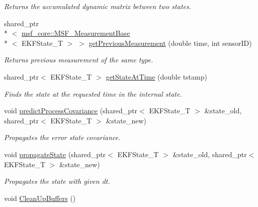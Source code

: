\begin{DoxyCompactItemize}
\begin{DoxyCompactList}\small\item\em Returns the accumulated dynamic matrix between two states. \end{DoxyCompactList}\item 
\hypertarget{classmsf__core_1_1MSF__Core_a9c6b7908fbc66dd2aebb2f08e7c0c4ff}{shared\-\_\-ptr\\*
$<$ \hyperlink{classmsf__core_1_1MSF__MeasurementBase}{msf\-\_\-core\-::\-M\-S\-F\-\_\-\-Measurement\-Base}\\*
$<$ E\-K\-F\-State\-\_\-\-T $>$ $>$ \hyperlink{classmsf__core_1_1MSF__Core_a9c6b7908fbc66dd2aebb2f08e7c0c4ff}{get\-Previous\-Measurement} (double time, int sensor\-I\-D)}\label{classmsf__core_1_1MSF__Core_a9c6b7908fbc66dd2aebb2f08e7c0c4ff}

\begin{DoxyCompactList}\small\item\em Returns previous measurement of the same type. \end{DoxyCompactList}\item 
shared\-\_\-ptr$<$ E\-K\-F\-State\-\_\-\-T $>$ \hyperlink{classmsf__core_1_1MSF__Core_a759141ac2b7e8722e2c32a28490654fb}{get\-State\-At\-Time} (double tstamp)
\begin{DoxyCompactList}\small\item\em Finds the state at the requested time in the internal state. \end{DoxyCompactList}\item 
void \hyperlink{classmsf__core_1_1MSF__Core_aef8ea1eb9aedc8c196d4cc9a8411f77a}{predict\-Process\-Covariance} (shared\-\_\-ptr$<$ E\-K\-F\-State\-\_\-\-T $>$ \&state\-\_\-old, shared\-\_\-ptr$<$ E\-K\-F\-State\-\_\-\-T $>$ \&state\-\_\-new)
\begin{DoxyCompactList}\small\item\em Propagates the error state covariance. \end{DoxyCompactList}\item 
void \hyperlink{classmsf__core_1_1MSF__Core_a37342ed8ed1b25628ca423b20c95c9e0}{propagate\-State} (shared\-\_\-ptr$<$ E\-K\-F\-State\-\_\-\-T $>$ \&state\-\_\-old, shared\-\_\-ptr$<$ E\-K\-F\-State\-\_\-\-T $>$ \&state\-\_\-new)
\begin{DoxyCompactList}\small\item\em Propagates the state with given dt. \end{DoxyCompactList}\item 
\hypertarget{classmsf__core_1_1MSF__Core_ac5cd6f27e1965b7416bb4b847c72c2e6}{void \hyperlink{classmsf__core_1_1MSF__Core_ac5cd6f27e1965b7416bb4b847c72c2e6}{Clean\-Up\-Buffers} ()}\label{classmsf__core_1_1MSF__Core_ac5cd6f27e1965b7416bb4b847c72c2e6}


\end{DoxyCompactItemize}
